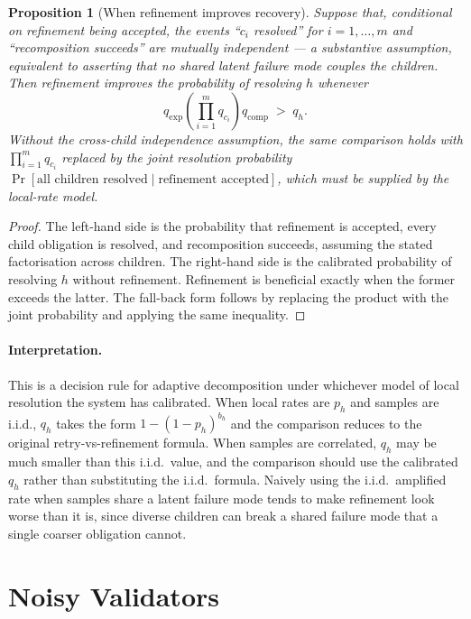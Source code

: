 \documentclass[11pt]{article}
\newtheorem{proposition}{Proposition}
\begin{document}
\begin{proposition}[When refinement improves recovery]
\label{prop:refinement-helps}
Suppose that, conditional on refinement being accepted, the events
``$c_i$ resolved'' for $i=1,\ldots,m$ and ``recomposition succeeds'' are
mutually independent — a substantive assumption, equivalent to asserting
that no shared latent failure mode couples the children. Then refinement
improves the probability of resolving $h$ whenever
\[
q_{\mathrm{exp}}
\left(\prod_{i=1}^m q_{c_i}\right)
q_{\mathrm{comp}}
\;>\;
q_h.
\]
Without the cross-child independence assumption, the same comparison holds
with $\prod_{i=1}^m q_{c_i}$ replaced by the joint resolution probability
$\Pr[\text{all children resolved}\mid \text{refinement accepted}]$, which
must be supplied by the local-rate model.
\end{proposition}

\begin{proof}
The left-hand side is the probability that refinement is accepted, every
child obligation is resolved, and recomposition succeeds, assuming the
stated factorisation across children. The right-hand side is the calibrated
probability of resolving $h$ without refinement. Refinement is beneficial
exactly when the former exceeds the latter. The fall-back form follows by
replacing the product with the joint probability and applying the same
inequality.
\end{proof}

\paragraph{Interpretation.}
This is a decision rule for adaptive decomposition under whichever model of
local resolution the system has calibrated. When local rates are $p_h$ and
samples are i.i.d., $q_h$ takes the form $1-(1-p_h)^{b_h}$ and the
comparison reduces to the original retry-vs-refinement formula. When samples
are correlated, $q_h$ may be much smaller than this i.i.d.\ value, and the
comparison should use the calibrated $q_h$ rather than substituting the
i.i.d.\ formula. Naively using the i.i.d.\ amplified rate when samples share
a latent failure mode tends to make refinement look worse than it is, since
diverse children can break a shared failure mode that a single coarser
obligation cannot.

\section{Noisy Validators}
\end{document}
